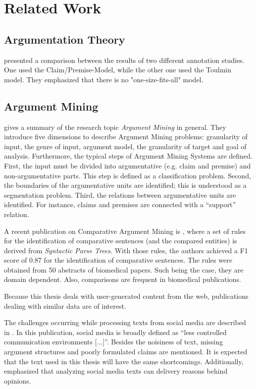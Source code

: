 \section{Related Work}
\subsection{Argumentation Theory}

\cite{Habernal2014Argumentation-M} presented a comparison between the results of two different annotation studies. One used the Claim/Premise-Model, while the other one used the Toulmin model. They emphasized that there is no "one-size-fits-all" model.

\label{sec:argth}
\subsection{Argument Mining}
\label{sec:argmine}
\cite{Lippi2016Argumentation-M} gives a summary of the research topic \emph{Argument Mining} in general. They introduce five dimensions to describe Argument Mining problems: granularity of input, the genre of input, argument model, the granularity of target and goal of analysis.  Furthermore, the typical steps of Argument Mining Systems are defined. First, the input must be divided into argumentative (e.g. claim and premise) and non-argumentative parts. This step is defined as a classification problem. Second, the boundaries of the argumentative units are identified; this is understood as a segmentation problem. Third, the relations between argumentative units are identified. For instance, claims and premises are connected with a \enquote{support} relation.\newline


A recent publication on Comparative Argument Mining is \cite{gupta2017identifying}, where a set of rules for the identification of comparative sentences (and the compared entities) is derived from \emph{Syntactic Parse Trees}. With those rules, the authors achieved a F1 score of 0.87 for the identification of comparative sentences. The rules were obtained from 50 abstracts of biomedical papers. Such being the case, they are domain dependent. Also, comparisons are frequent in biomedical publications.\newline

Because this thesis deals with user-generated content from the web, publications dealing with similar data are of interest.

The challenges occurring while processing texts from social media are described in \cite{Snajder2017Social-Media-Ar}.  In this publication, social media is broadly defined as \enquote{less controlled communication environments [...]}. Besides the noisiness of text, missing argument structures and poorly formulated claims are mentioned. It is expected that the text used in this thesis will have the same shortcomings. Additionally, \cite{Snajder2017Social-Media-Ar} emphasized that analyzing social media texts can delivery reasons behind opinions. 

